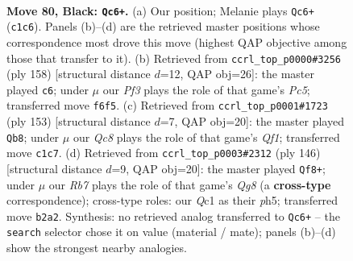 \documentclass[11pt]{article}
\begin{document}
\clearpage

\begin{figure}[p]\centering
\begin{subfigure}{0.46\textwidth}\centering
\resizebox{\linewidth}{!}{%
\newchessgame
\chessboard[
  setfen={3Q4/8/K4pk1/8/8/6P1/1r6/2q5 b - - 11 80},
  showmover=false,
  pgfstyle=straightmove, color=movearrow, markmove={c1-c6}
]}
\caption{}
\end{subfigure}\hfill
\begin{subfigure}{0.46\textwidth}\centering
\resizebox{\linewidth}{!}{%
\newchessgame
\chessboard[
  setfen={8/1R6/K4k2/2P5/8/8/P1q5/8 w - - 4 80},
  showmover=false,
  pgfstyle=straightmove, color=movearrow, markmove={c5-c6}
]}
\caption{}
\end{subfigure}
\\[4pt]
\begin{subfigure}{0.46\textwidth}\centering
\resizebox{\linewidth}{!}{%
\newchessgame
\chessboard[
  setfen={5q2/3Q4/8/5pk1/8/1P6/8/7K b - - 13 77},
  showmover=false,
  pgfstyle=straightmove, color=movearrow, markmove={f8-b8}
]}
\caption{}
\end{subfigure}\hfill
\begin{subfigure}{0.46\textwidth}\centering
\resizebox{\linewidth}{!}{%
\newchessgame
\chessboard[
  setfen={6Q1/8/3p1k2/7p/q7/8/1KP5/8 w - - 2 74},
  showmover=false,
  pgfstyle=straightmove, color=movearrow, markmove={g8-f8}
]}
\caption{}
\end{subfigure}
\caption{\textbf{Move 80, Black: \texttt{Qc6+}.} (a) Our position; Melanie plays \texttt{Qc6+} (\texttt{c1c6}). Panels (b)--(d) are the retrieved master positions whose correspondence most drove this move (highest QAP objective among those that transfer to it). (b) Retrieved from \texttt{ccrl\_top\_p0000\#3256} (ply 158) [structural distance $d$=12, QAP obj=26]: the master played \texttt{c6}; under $\mu$ our \emph{Pf3} plays the role of that game's \emph{Pc5}; transferred move \texttt{f6f5}. (c) Retrieved from \texttt{ccrl\_top\_p0001\#1723} (ply 153) [structural distance $d$=7, QAP obj=20]: the master played \texttt{Qb8}; under $\mu$ our \emph{Qc8} plays the role of that game's \emph{Qf1}; transferred move \texttt{c1c7}. (d) Retrieved from \texttt{ccrl\_top\_p0003\#2312} (ply 146) [structural distance $d$=9, QAP obj=20]: the master played \texttt{Qf8+}; under $\mu$ our \emph{Rb7} plays the role of that game's \emph{Qg8} (a \textbf{cross-type} correspondence); cross-type roles: our \emph{Q}c1 as their \emph{p}h5; transferred move \texttt{b2a2}. Synthesis: no retrieved analog transferred to \texttt{Qc6+} -- the \texttt{search} selector chose it on value (material / mate); panels (b)--(d) show the strongest nearby analogies.}
\label{fig:thought-m159}
\end{figure}
\end{document}
